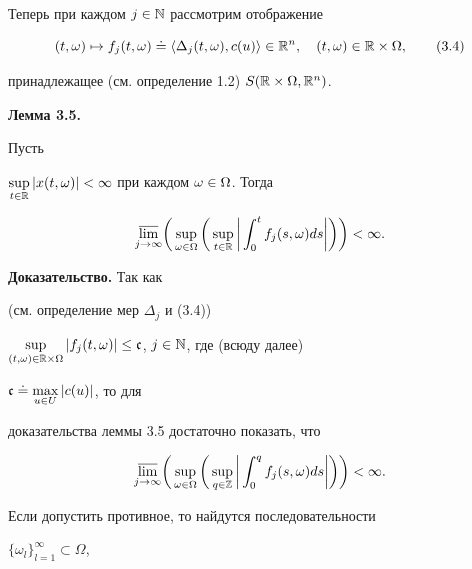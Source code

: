 \medskip





Теперь при каждом $j\in \Bbb N$ рассмотрим отображение


\begin{equation}


\tm\mapsto f_j\tm\doteq \la \Delta_j\tm,c(u)\ra\in\Bbb R^n,


\quad \tm\in \Bbb R\times\Omega,


\tag{3.4}


\end{equation}


принадлежащее (см. определение 1.2) $S(\Bbb R\times\Omega,\Bbb R^n)$.


\medskip





{\bf Лемма 3.5.} {\it


Пусть 


$\sup\limits_{t\in\Bbb R}|x(t,\omega)|<\infty$ при каждом $\omega\in\Omega$. Тогда}


$$


\underset{j\to\infty}{\varlimsup}


\bigg(\sup\limits_{\mm}\bigg(\sup\limits_{t\in\Bbb R}


\bigg|\int_0^t f_j(s,\omega)ds\bigg|\bigg)\bigg)<\infty.


$$





{\bf Доказательство.} Так как


(см. определение мер $\Delta_j$ и (3.4))


$\sup\limits_{\tm\in\Bbb R\times\Omega}


|f_j\tm|\le \frak c$, $j\in\Bbb N$, где (всюду далее)


$\frak c\doteq \max\limits_{u\in U}|c(u)|$, то для


доказательства леммы 3.5 достаточно показать, что


$$


\underset{j\to\infty}{\varlimsup}\bigg(


\sup\limits_{\mm}\bigg(\sup\limits_{q\in\Bbb Z}\bigg|\int_0^q


f_j(s,\omega)ds\bigg|\bigg)\bigg)<\infty .


$$


Если допустить противное, то найдутся последовательности


$\{\omega_l\}_{l=1}^{\infty}\subset\Omega$,


